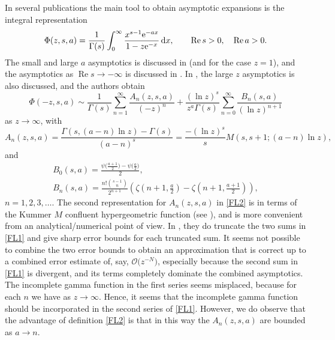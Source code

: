 \documentclass[pdftex]{sigma}
\numberwithin{equation}{section}
\def\expe{{\rm e}}
\def\id{\,{\rm d}}
\def\bigO{{\mathcal O}}
\begin{document}
In several publications the main tool to obtain asymptotic expansions is the integral
representation
\begin{equation}\label{int}
 \Phi(z,s,a)=\frac1{\Gamma(s)}\int_0^\infty
 \frac{x^{s-1}\expe^{-ax}}{1-z\expe^{-x}}\id x,\qquad \operatorname{Re} s>0,\quad\operatorname{Re} a>0.
\end{equation}
The small and large $a$ asymptotics is discussed in \cite{Cai2019,Ferreira2004,paris2016stokes} (and \cite{Nemes2017} for the case $z=1$), and
the asymptotics as $\operatorname{Re} s\to -\infty$ is discussed in \cite{Navas2013}.
In \cite{Ferreira2004}, the large $z$ asymptotics is also discussed, and the authors obtain
\begin{equation}\label{FL1}
 \Phi(-z,s,a)\sim\frac1{\Gamma(s)}\sum_{n=1}^\infty
 \frac{A_n(z,s,a)}{(-z)^{n}}+\frac{(\ln z)^s}{z^a\Gamma(s)}
 \sum_{n=0}^\infty\frac{B_n(s,a)}{(\ln z)^{n+1}}
\end{equation}
as $z\to\infty$, with
\begin{equation}\label{FL2}
 A_n(z,s,a)=\frac{\Gamma(s,(a-n)\ln z)-\Gamma(s)}{(a-n)^s}
 =\frac{-(\ln z)^s}{s}M(s,s+1;(a-n)\ln z),
\end{equation}
and
\begin{gather*}%
 B_0(s,a)=\frac{\psi\bigl(\frac{a+1}2\bigr)-
 \psi\bigl(\frac{a}2\bigr)}2,\\
 B_n(s,a)=\frac{n!{s-1\choose n}}{2^{n+1}}\left( \zeta\left(n+1,\frac{a}2\right)-
 \zeta\left(n+1,\frac{a+1}2\right)\right),
\end{gather*}
$n=1,2,3,\ldots$. The second representation for $A_n(z,s,a)$ in \eqref{FL2} is in terms
of the Kummer $M$ confluent hypergeometric function
(see \cite[\href{https://dlmf.nist.gov/13.2.E2}{equation~(13.2.2)}]{NIST:DLMF}),
and is more convenient from an analytical/numerical point of view.
In \cite{Ferreira2004}, they do truncate the two sums in \eqref{FL1} and give sharp error bounds
for each truncated sum. It seems not possible to combine the two error bounds
to obtain an approximation
that is correct up to a combined error estimate of, say, $\bigO\bigl(z^{-N}\bigr)$,
especially because the second sum in \eqref{FL1} is divergent, and its terms completely
dominate the combined asymptotics. The incomplete gamma function in the first series seems
misplaced, because for each $n$ we have
\smash{$\frac{\Gamma(s,(a-n)\ln z)}{(a-n)^s (-z)^{n}}
=\bigO\bigl(\frac{(\ln z)^s}{z^a}\bigr)$} as $z\to\infty$.
Hence, it seems that the incomplete gamma function should be incorporated in the second
series of \eqref{FL1}. However, we do observe that the advantage of definition
\eqref{FL2} is that in this way the $A_n(z,s,a)$ are bounded as $a\to n$.
\end{document}
